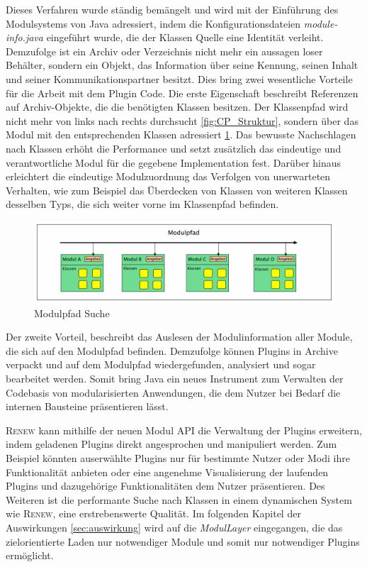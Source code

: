 		Dieses Verfahren wurde ständig bemängelt und wird mit der Einführung des Modulsystems von Java adressiert, indem die Konfigurationsdateien \textit{module-info.java} eingeführt wurde, die der Klassen Quelle eine Identität verleiht. Demzufolge ist ein Archiv oder Verzeichnis nicht mehr ein aussagen loser Behälter, sondern ein Objekt, das Information über seine Kennung, seinen Inhalt und seiner Kommunikationspartner besitzt.\newline
		Dies bring zwei wesentliche Vorteile für die Arbeit mit dem Plugin Code. Die erste Eigenschaft beschreibt Referenzen auf Archiv-Objekte, die die benötigten Klassen besitzen. Der Klassenpfad wird nicht mehr von links nach rechts durchsucht \ref{fig:CP_Struktur}, sondern über das Modul mit den entsprechenden Klassen adressiert \ref{fig:MP_Struktur}. \newline
		Das bewusste Nachschlagen nach Klassen erhöht die Performance und setzt zusätzlich das eindeutige und verantwortliche Modul für die gegebene Implementation fest. Darüber hinaus erleichtert die eindeutige Modulzuordnung das Verfolgen von unerwarteten Verhalten, wie zum Beispiel das Überdecken von Klassen von weiteren Klassen desselben Typs, die sich weiter vorne im Klassenpfad befinden.\bigbreak 
		\begin{figure}[h!]
		  \centering
		  \includegraphics[width=\textwidth]{material/images/Modulpfad.pdf}
		  \caption{Modulpfad Suche}
		  \label{fig:MP_Struktur}
		\end{figure}
		Der zweite Vorteil, beschreibt das Auslesen der Modulinformation aller Module, die sich auf den Modulpfad befinden. Demzufolge können Plugins in Archive verpackt und auf dem Modulpfad wiedergefunden, analysiert und sogar bearbeitet werden. Somit bring Java ein neues Instrument zum Verwalten der Codebasis von modularisierten Anwendungen, die dem Nutzer bei Bedarf die internen Bausteine präsentieren lässt.\bigbreak

		\textsc{Renew} kann mithilfe der neuen Modul API die Verwaltung der Plugins erweitern, indem geladenen Plugins direkt angesprochen und manipuliert werden. Zum Beispiel könnten auserwählte Plugins nur für bestimmte Nutzer oder Modi ihre Funktionalität anbieten oder eine angenehme Visualisierung der laufenden Plugins und dazugehörige Funktionalitäten dem Nutzer präsentieren. Des Weiteren ist die performante Suche nach Klassen in einem dynamischen System wie \textsc{Renew}, eine erstrebenswerte Qualität.  \newline
		Im folgenden Kapitel der Auswirkungen \ref{sec:auswirkung} wird auf die \textit{ModulLayer} eingegangen, die das zielorientierte Laden nur notwendiger Module und somit nur notwendiger Plugins ermöglicht.


